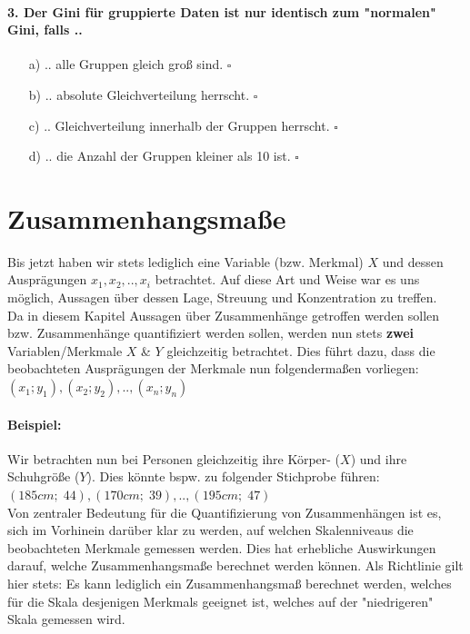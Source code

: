\documentclass[a4paper]{article}
\begin{document}
\paragraph{3. Der Gini für gruppierte Daten ist nur identisch zum "normalen" Gini, falls ..}

\begin{itemize}
    \item[a)] .. alle Gruppen gleich groß sind. \hfill $\square$
    \item[b)] .. absolute Gleichverteilung herrscht. \hfill $\square$
    \item[c)] .. Gleichverteilung innerhalb der Gruppen herrscht. \hfill $\square$
    \item[d)] .. die Anzahl der Gruppen kleiner als 10 ist. \hfill $\square$
\end{itemize}

\newpage

\section{Zusammenhangsmaße}
Bis jetzt haben wir stets lediglich eine Variable (bzw. Merkmal) $X$ und dessen Ausprägungen $x_1, x_2,.., x_i$ betrachtet. Auf diese Art und Weise war es uns möglich, Aussagen über dessen Lage, Streuung und Konzentration zu treffen.\\
Da in diesem Kapitel Aussagen über Zusammenhänge getroffen werden sollen bzw. Zusammenhänge quantifiziert werden sollen, werden nun stets \textbf{zwei} Variablen/Merkmale $X$ \& $Y$ gleichzeitig betrachtet. Dies führt dazu, dass die beobachteten Ausprägungen der Merkmale nun folgendermaßen vorliegen: $(x_1; y_1), (x_2; y_2), .., (x_n; y_n)$

\noindent \paragraph{Beispiel:} Wir betrachten nun bei Personen gleichzeitig ihre Körper- ($X$) und ihre Schuhgröße ($Y$). Dies könnte bspw. zu folgender Stichprobe führen: $(185cm;\; 44), (170cm;\; 39), .., (195cm;\; 47)$\\

\noindent Von zentraler Bedeutung für die Quantifizierung von Zusammenhängen ist es, sich im Vorhinein darüber klar zu werden, auf welchen Skalenniveaus die beobachteten Merkmale gemessen werden. Dies hat erhebliche Auswirkungen darauf, welche Zusammenhangsmaße berechnet werden können. Als Richtlinie gilt hier stets: Es kann lediglich ein Zusammenhangsmaß berechnet werden, welches für die Skala desjenigen Merkmals geeignet ist, welches auf der "niedrigeren" Skala gemessen wird.
\end{document}
